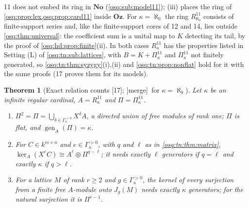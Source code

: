 \documentclass[11pt,letterpaper]{article}
\numberwithin{equation}{section}
\newtheorem{theorem}{Theorem}[section]
\theoremstyle{definition}
\theoremstyle{remark}
\theoremstyle{plain}
\newcommand{\No}{\mathbf{No}}
\newcommand{\Oz}{\mathbf{Oz}}
\newcommand{\gen}{\operatorname{gen}}
\newcommand{\src}[1]{\textup{\textsf{[#1]}}}
\newcommand{\merge}{\textup{\textsf{[merge]}}}
\begin{document}
11 does not embed its ring in $\No$ (\cref{osq:sub:model11}); (iii) places the ring of \cref{osq:prop:lex,osq:prop:card11} inside
$\Oz$. For $\kappa=\aleph_0$ the ring $R^{11}_{\aleph_0}$ consists of finite-support series and, like the finite-support cores of
12 and 14, lies outside \cref{osq:thm:universal}: the coefficient sum is a unital map to $K$ detecting its tail, by the proof of
\cref{osq:hd:prop:finite}(ii). In both cases $R^{11}_\kappa$ has the properties listed in Setting (L) of
\cref{osq:tn:sub:lattices}, with $B=K+\Pi^{11}_\kappa$ and $\Pi^{11}_\kappa$ not finitely generated, so
\cref{osq:tn:thm:syzygy}(i),(ii) and \cref{osq:tn:prop:nonflat} hold for it with the same proofs (17 proves them for its models).

\begin{theorem}[Exact relation counts \src{17}; \merge\ for $\kappa=\aleph_0$]\label{osq:rel:thm:kappa}
Let $\kappa$ be an infinite regular cardinal, $A=R^{11}_\kappa$ and $\Pi=\Pi^{11}_\kappa$.
\begin{enumerate}
\item $\Pi^2=\Pi=\bigcup_{\delta\in\Gamma_\kappa^{>0}}X^\delta A$, a directed union of free modules of rank one; $\Pi$ is flat, and
$\gen_A(\Pi)=\kappa$.
\item For $C\in k^{m\times n}$ and $e\in\Gamma_\kappa^{>0}$, with $q$ and $\ell$ as in \cref{osq:tn:thm:matrix},
$\ker_A(X^eC)\cong A^\ell\oplus\Pi^{q-\ell}$; it needs exactly $\ell$ generators if $q=\ell$ and exactly $\kappa$ if $q>\ell$.
\item For a lattice $M$ of rank $r\ge2$ and $g\in\Gamma_\kappa^{>0}$, the kernel of every surjection from a finite free
$A$-module onto $J_g(M)$ needs exactly $\kappa$ generators; for the natural surjection it is $\Pi^{r-1}$.
\end{enumerate}
\end{theorem}
\end{document}
